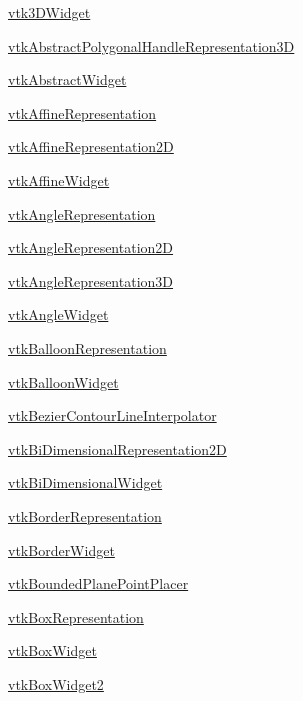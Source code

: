 
\begin{DoxyItemize}
\item \hyperlink{vtkwidgets_vtk3dwidget}{vtk3\-D\-Widget}  
\item \hyperlink{vtkwidgets_vtkabstractpolygonalhandlerepresentation3d}{vtk\-Abstract\-Polygonal\-Handle\-Representation3\-D}  
\item \hyperlink{vtkwidgets_vtkabstractwidget}{vtk\-Abstract\-Widget}  
\item \hyperlink{vtkwidgets_vtkaffinerepresentation}{vtk\-Affine\-Representation}  
\item \hyperlink{vtkwidgets_vtkaffinerepresentation2d}{vtk\-Affine\-Representation2\-D}  
\item \hyperlink{vtkwidgets_vtkaffinewidget}{vtk\-Affine\-Widget}  
\item \hyperlink{vtkwidgets_vtkanglerepresentation}{vtk\-Angle\-Representation}  
\item \hyperlink{vtkwidgets_vtkanglerepresentation2d}{vtk\-Angle\-Representation2\-D}  
\item \hyperlink{vtkwidgets_vtkanglerepresentation3d}{vtk\-Angle\-Representation3\-D}  
\item \hyperlink{vtkwidgets_vtkanglewidget}{vtk\-Angle\-Widget}  
\item \hyperlink{vtkwidgets_vtkballoonrepresentation}{vtk\-Balloon\-Representation}  
\item \hyperlink{vtkwidgets_vtkballoonwidget}{vtk\-Balloon\-Widget}  
\item \hyperlink{vtkwidgets_vtkbeziercontourlineinterpolator}{vtk\-Bezier\-Contour\-Line\-Interpolator}  
\item \hyperlink{vtkwidgets_vtkbidimensionalrepresentation2d}{vtk\-Bi\-Dimensional\-Representation2\-D}  
\item \hyperlink{vtkwidgets_vtkbidimensionalwidget}{vtk\-Bi\-Dimensional\-Widget}  
\item \hyperlink{vtkwidgets_vtkborderrepresentation}{vtk\-Border\-Representation}  
\item \hyperlink{vtkwidgets_vtkborderwidget}{vtk\-Border\-Widget}  
\item \hyperlink{vtkwidgets_vtkboundedplanepointplacer}{vtk\-Bounded\-Plane\-Point\-Placer}  
\item \hyperlink{vtkwidgets_vtkboxrepresentation}{vtk\-Box\-Representation}  
\item \hyperlink{vtkwidgets_vtkboxwidget}{vtk\-Box\-Widget}  
\item \hyperlink{vtkwidgets_vtkboxwidget2}{vtk\-Box\-Widget2}  

\end{DoxyItemize}
